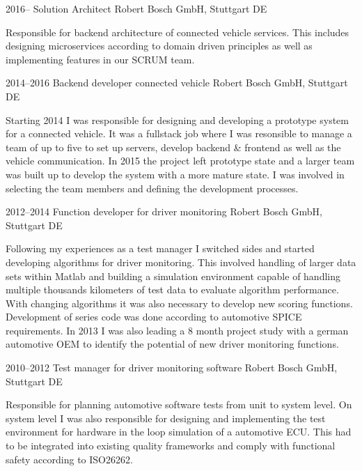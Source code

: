 \documentclass[]{friggeri-cv} %
\begin{document}
\begin{entrylist}


\entry
{2016--}
{Solution Architect}
{Robert Bosch GmbH, Stuttgart DE}
{Responsible for backend architecture of connected vehicle services. This includes designing microservices according to domain driven principles as well as implementing features in our SCRUM team.

}
\end{entrylist}
\begin{entrylist}
\entry
{2014--2016}
{Backend developer connected vehicle}
{Robert Bosch GmbH, Stuttgart DE}
{Starting 2014 I was responsible for designing and developing a prototype system for a connected vehicle. It was a fullstack job where I was resonsible to manage a team of up to five to set up servers, develop backend \& frontend as well as the vehicle communication. In 2015 the project left prototype state and a larger team was built up to develop the system with a more mature state. I was involved in selecting the team members and defining the development processes.

}
\end{entrylist}
\begin{entrylist}
\entry
{2012--2014}
{Function developer for driver monitoring}
{Robert Bosch GmbH, Stuttgart DE}
{Following my experiences as a test manager I switched sides and started developing algorithms for driver monitoring. This involved handling of larger data sets within Matlab and building a simulation environment capable of handling multiple thousands kilometers of test data to evaluate algorithm performance. With changing algorithms it was also necessary to develop new scoring functions. Development of series code was done according to automotive SPICE requirements. In 2013 I was also leading a 8 month project study with a german automotive OEM to identify the potential of new driver monitoring functions.

}
\end{entrylist}
\begin{entrylist}
\entry
{2010--2012}
{Test manager for driver monitoring software}
{Robert Bosch GmbH, Stuttgart DE}
{Responsible for planning automotive software tests from unit to system level. On system level I was also responsible for designing and implementing the test environment for hardware in the loop simulation of a automotive ECU. This had to be integrated into existing quality frameworks and comply with functional safety according to ISO26262.

}
\end{entrylist}
\end{document}
